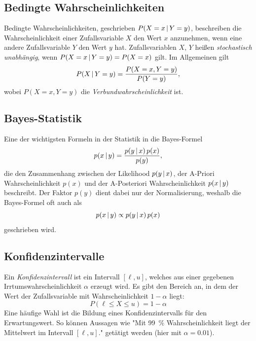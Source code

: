 		\subsection{Bedingte Wahrscheinlichkeiten}
			Bedingte Wahrscheinlichkeiten, geschrieben \( P(X = x \,\vert\, Y = y) \), beschreiben die Wahrscheinlichkeit einer Zufallsvariable \(X\) den Wert \(x\) anzunehmen, wenn eine andere Zufallsvariable \(Y\) den Wert \(y\) hat. Zufallsvariablen \(X\), \(Y\) heißen \emph{stochastisch unabhängig}, wenn \( P(X = x \,\vert\, Y = y) = P(X = x) \) gilt. Im Allgemeinen gilt
			\begin{equation}
				P(X \,\vert\, Y = y) = \frac{P(X = x, Y = y)}{P(Y = y)},
			\end{equation}
			wobei \( P(X = x, Y = y) \) die \emph{Verbundwahrscheinlichkeit} ist.

		\subsection{Bayes-Statistik}
			Eine der wichtigsten Formeln in der Statistik in die Bayes-Formel
			\begin{equation}
				p(x \,\vert\, y) = \frac{p(y \,\vert\, x) \, p(x)}{p(y)},
			\end{equation}
			die den Zusammenhang zwischen der Likelihood \( p(y \,\vert\, x) \), der A-Priori Wahrscheinlichkeit \( p(x) \) und der A-Posteriori Wahrscheinlichkeit \( p(x \,\vert\, y) \) beschreibt. Der Faktor \( p(y) \) dient dabei nur der Normalisierung, weshalb die Bayes-Formel oft auch als
			\begin{equation}
				p(x \,\vert\, y) \propto p(y \,\vert\, x) \, p(x)
			\end{equation}
			geschrieben wird.

		\subsection{Konfidenzintervalle}
			Ein \emph{Konfidenzintervall} ist ein Intervall \( [\ell, u] \), welches aus einer gegebenen Irrtumswahrscheinlichkeit \(\alpha\) erzeugt wird. Es gibt den Bereich an, in dem der Wert der Zufallsvariable mit Wahrscheinlichkeit \( 1 - \alpha \) liegt:
			\begin{equation}
				P(\ell \leq X \leq u) = 1 - \alpha
			\end{equation}
			Eine häufige Wahl ist die Bildung eines Konfidenzintervalls für den Erwartungswert. So können Aussagen wie "Mit \SI{99}{\percent} Wahrscheinlichkeit liegt der Mittelwert im Intervall \( [\ell, u] \)." getätigt werden (hier mit \( \alpha = 0.01 \)).

